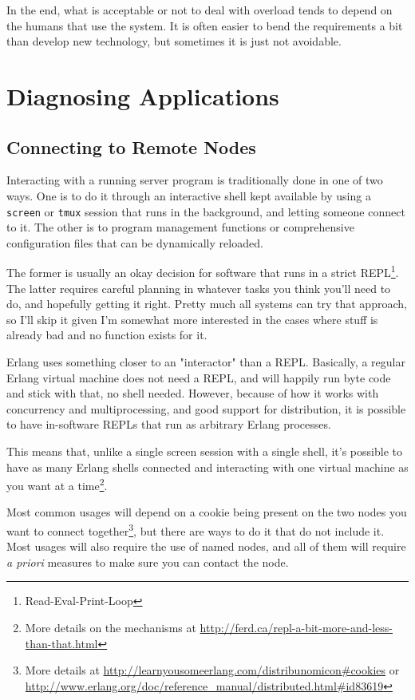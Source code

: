 \documentclass[11pt, oneside]{book}   	%
\newcommand{\app}[1]{\Verb`#1`}
\begin{document}
In the end, what is acceptable or not to deal with overload tends to depend on the humans that use the system. It is often easier to bend the requirements a bit than develop new technology, but sometimes it is just not avoidable.


\part{Diagnosing Applications}



\chapter{Connecting to Remote Nodes}
\label{chap:connecting}

Interacting with a running server program is traditionally done in one of two ways. One is to do it through an interactive shell kept available by using a \app{screen} or \app{tmux} session that runs in the background, and letting someone connect to it. The other is to program management functions or comprehensive configuration files that can be dynamically reloaded.

The former is usually an okay decision for software that runs in a strict REPL\footnote{Read-Eval-Print-Loop}. The latter requires careful planning in whatever tasks you think you'll need to do, and hopefully getting it right. Pretty much all systems can try that approach, so I'll skip it given I'm somewhat more interested in the cases where stuff is already bad and no function exists for it.

Erlang uses something closer to an "interactor" than a REPL. Basically, a regular Erlang virtual machine does not need a REPL, and will happily run byte code and stick with that, no shell needed. However, because of how it works with concurrency and multiprocessing, and good support for distribution, it is possible to have in-software REPLs that run as arbitrary Erlang processes.

This means that, unlike a single screen session with a single shell, it's possible to have as many Erlang shells connected and interacting with one virtual machine as you want at a time\footnote{More details on the mechanisms at \href{http://ferd.ca/repl-a-bit-more-and-less-than-that.html}{http://ferd.ca/repl-a-bit-more-and-less-than-that.html}}.

Most common usages will depend on a cookie being present on the two nodes you want to connect together\footnote{More details at \href{http://learnyousomeerlang.com/distribunomicon\#cookies}{http://learnyousomeerlang.com/distribunomicon\#cookies} or \href{http://www.erlang.org/doc/reference\_manual/distributed.html\#id83619}{http://www.erlang.org/doc/reference\_manual/distributed.html\#id83619}}, but there are ways to do it that do not include it. Most usages will also require the use of named nodes, and all of them will require \emph{a priori} measures to make sure you can contact the node.
\end{document}

